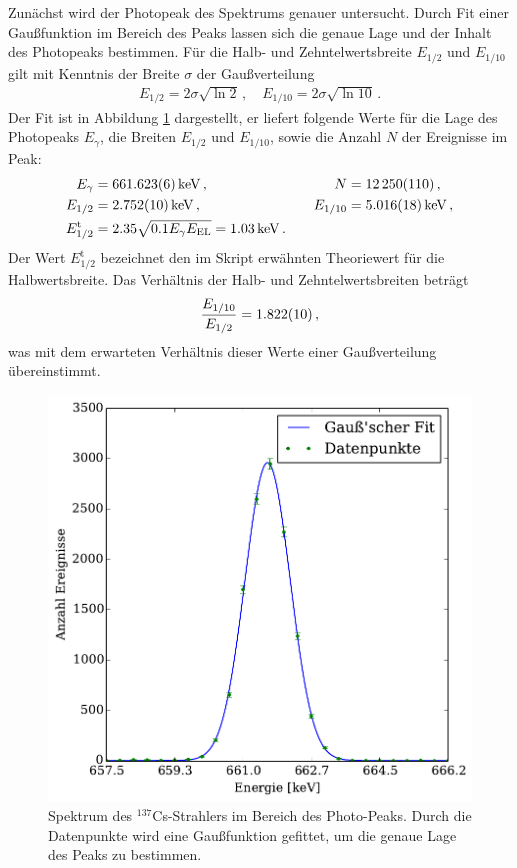 Zunächst wird der Photopeak des Spektrums genauer untersucht. Durch Fit einer Gaußfunktion im Bereich des Peaks lassen sich die genaue Lage und der Inhalt des Photopeaks bestimmen.
Für die Halb- und Zehntelwertsbreite $E_{1/2}$ und $E_{1/10}$ gilt mit Kenntnis der Breite $\sigma$ der Gaußverteilung
\begin{align*}
    E_{1/2} = 2\sigma\sqrt{\ln 2}\,,\quad E_{1/10} = 2\sigma\sqrt{\ln 10}\,.
\end{align*}
Der Fit ist in Abbildung \ref{fig:cs_gauss} dargestellt, er liefert folgende Werte für die Lage des Photopeaks $E_\gamma$, die Breiten $E_{1/2}$ und $E_{1/10}$, sowie die Anzahl $N$ der Ereignisse im Peak:
\begin{align*}
    E_\gamma &= \SI{661.623+-0.006}{keV} \,,&\quad N &= \num{12250+-110}\,,\\
    E_{1/2} &= \SI{2.752+-0.010}{keV}\,,&\quad E_{1/10} &= \SI{5.016+-0.018}{keV}\,,\\
    E_{1/2}^\text{t} &= \num{2.35} \sqrt{\num{0.1} E_\gamma E_\text{EL}} = \SI{1.03+-0.00}{keV}\,.
\end{align*}
Der Wert $E_{1/2}^\text{t}$ bezeichnet den im Skript erwähnten Theoriewert für die Halbwertsbreite.
Das Verhältnis der Halb- und Zehntelwertsbreiten beträgt
\begin{align*}
    \frac{E_{1/10}}{E_{1/2}} = \num{1.822+-0.010}\,,
\end{align*}
was mit dem erwarteten Verhältnis dieser Werte einer Gaußverteilung übereinstimmt.
\begin{figure}
    \centering
    \includegraphics[width=0.5\linewidth]{img/06_caesium_fit.pdf}
    \caption{
        Spektrum des $^{137}$Cs-Strahlers im Bereich des Photo-Peaks. Durch die Datenpunkte wird eine Gaußfunktion gefittet, um die genaue Lage des Peaks zu bestimmen.
    }
    \label{fig:cs_gauss}
\end{figure}

